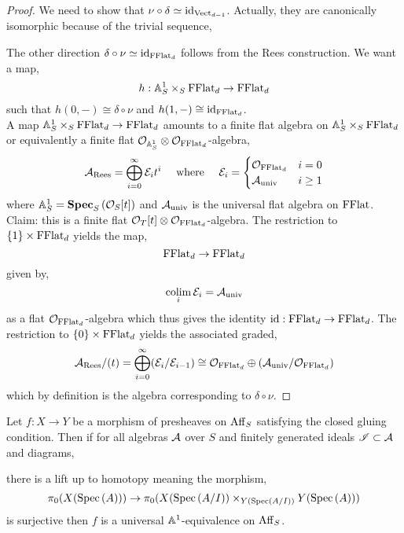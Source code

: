 \documentclass[12pt]{article}
\begin{document}
\begin{proof}
We need to show that $\nu \circ \delta \simeq \mathrm{id}_{\mathrm{Vect}_{d-1}}$. Actually, they are canonically isomorphic because of the trivial sequence,
\begin{center}
\end{center}
The other direction $\delta \circ \nu \simeq \mathrm{id}_{\mathrm{FFlat}_d}$ follows from the Rees construction. We want a map,
\[ h : \mathbb{A}^1_S \times_S \mathrm{FFlat}_d \to \mathrm{FFlat}_d \]
such that $h(0, -) \cong \delta \circ \nu$ and $h(1, -) \cong \mathrm{id}_{\mathrm{FFlat}_d}$. 
\bigskip\\
A map $\mathbb{A}^1_S \times_S \mathrm{FFlat}_d \to \mathrm{FFlat}_d$ amounts to a finite flat algebra on $\mathbb{A}^1_S \times_S \mathrm{FFlat}_d$ or equivalently a finite flat $\mathcal{O}_{\mathbb{A}^1_S} \otimes \mathcal{O}_{\mathrm{FFlat}_d}$-algebra,
\[ \mathcal{A}_{\text{Rees}} = \bigoplus_{i = 0}^\infty \mathcal{E}_i t^i \quad \text{ where } \quad \mathcal{E}_i = 
\begin{cases}
\mathcal{O}_{\mathrm{FFlat}_d} & i = 0
\\
\mathcal{A}_{\text{univ}} & i \ge 1
\end{cases} \]
where $\mathbb{A}^1_S = \mathbf{Spec}_{S}\left( \mathcal{O}_{S}[t] \right)$ and $\mathcal{A}_{\text{univ}}$ is the universal flat algebra on $\mathrm{FFlat}$. Claim: this is a finite flat $\mathcal{O}_{T}[t] \otimes \mathcal{O}_{\mathrm{FFlat}_d}$-algebra. The restriction to $\{ 1 \} \times \mathrm{FFlat}_d$ yields the map,
\[ \mathrm{FFlat}_d \to \mathrm{FFlat}_d \]
given by,
\[ \operatorname*{\mathrm{colim}}_i \mathcal{E}_i = \mathcal{A}_{\text{univ}} \]
as a flat $\mathcal{O}_{\mathrm{FFlat}_d}$-algebra which thus gives the identity $\mathrm{id} : \mathrm{FFlat}_d \to \mathrm{FFlat}_d$. The restriction to $\{ 0 \} \times \mathrm{FFlat}_d$ yields the associated graded,
\[ \mathcal{A}_{\text{Rees}} / (t) = \bigoplus_{i = 0}^{\infty} (\mathcal{E}_i / \mathcal{E}_{i-1}) \cong \mathcal{O}_{\mathrm{FFlat}_d} \oplus (\mathcal{A}_{\text{univ}} / \mathcal{O}_{\mathrm{FFlat}_d}) \]
which by definition is the algebra corresponding to $\delta \circ \nu$. 
\end{proof}

\begin{prop}
Let $f : X \to Y$ be a morphism of presheaves on $\mathrm{Aff}_S$ satisfying the closed gluing condition. Then if for all algebras $\mathcal{A}$ over $S$ and finitely generated ideals $\mathscr{I} \subset \mathcal{A}$ and diagrams,
\begin{center}
\end{center}
there is a lift up to homotopy meaning the morphism,
\[ \pi_0(X(\mathrm{Spec}\left( A \right))) \to \pi_0( X(\mathrm{Spec}\left( A/I \right)) \times_{Y(\mathrm{Spec}\left( A/I \right))} Y(\mathrm{Spec}\left( A \right))) \]
is surjective then $f$ is a universal $\mathbb{A}^1$-equivalence on $\mathrm{Aff}_S$. 
\end{prop}
\end{document}
